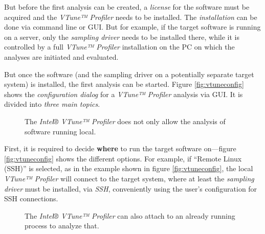     But before the first analysis can be created, a \emph{license} for the software must be acquired and the \textit{VTune™ Profiler} needs to be installed. The \emph{installation} can be done via command line or GUI. But for example, if the target software is running on a server, only the \emph{sampling driver} needs to be installed there, while it is controlled by a full \textit{VTune™ Profiler} installation on the PC on which the analyses are initiated and evaluated.

    But once the software (and the sampling driver on a potentially separate target system) is installed, the first analysis can be started. Figure \ref{fig:vtuneconfig} shows the \emph{configuration dialog} for a \textit{VTune™ Profiler} analysis via GUI. It is divided into \emph{three main topics}.

\begin{@empty}
    \setlength{\fboxsep}{0pt}%
    \setlength{\fboxrule}{1pt}%
    
    \begin{figure}[h]
        \centering
        \vspace{.75em}
        \caption[Where is the VTune™ Profiler target running?]{The \textit{Intel® VTune™ Profiler} does not only allow the analysis of software running local.}
        \label{fig:vtunewhere}
    \end{figure}
\end{@empty}

    First, it is required to decide \textbf{where} to run the target software on---figure \ref{fig:vtuneconfig} shows the different options. For example, if ``Remote Linux (SSH)'' is selected, as in the example shown in figure \ref{fig:vtuneconfig}, the local \textit{VTune™ Profiler} will connect to the target system, where at least the \emph{sampling driver} must be installed, via \textit{SSH}, conveniently using the user's configuration for SSH connections.

\begin{@empty}
    \setlength{\fboxsep}{0pt}%
    \setlength{\fboxrule}{1pt}%
    
    \begin{figure}[h]
        \centering
        \vspace{.75em}
        \caption[What is analyzed by the VTune™ Profiler?]{The \textit{Intel® VTune™ Profiler} can also attach to an already running process to analyze that.}
        \label{fig:vtunewhat}
    \end{figure}
\end{@empty}

